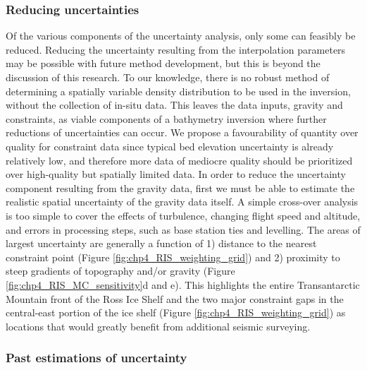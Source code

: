 \subsubsection{Reducing uncertainties}

Of the various components of the uncertainty analysis, only some can feasibly be reduced. Reducing the uncertainty resulting from the interpolation parameters may be possible with future method development, but this is beyond the discussion of this research. To our knowledge, there is no robust method of determining a spatially variable density distribution to be used in the inversion, without the collection of in-situ data. This leaves the data inputs, gravity and constraints, as viable components of a bathymetry inversion where further reductions of uncertainties can occur. We propose a favourability of quantity over quality for constraint data since typical bed elevation uncertainty is already relatively low, and therefore more data of mediocre quality should be prioritized over high-quality but spatially limited data. In order to reduce the uncertainty component resulting from the gravity data, first we must be able to estimate the realistic spatial uncertainty of the gravity data itself. A simple cross-over analysis is too simple to cover the effects of turbulence, changing flight speed and altitude, and errors in processing steps, such as base station ties and levelling. The areas of largest uncertainty are generally a function of 1) distance to the nearest constraint point (Figure \ref{fig:chp4_RIS_weighting_grid}) and 2) proximity to steep gradients of topography and/or gravity (Figure \ref{fig:chp4_RIS_MC_sensitivity}d and e). This highlights the entire Transantarctic Mountain front of the Ross Ice Shelf and the two major constraint gaps in the central-east portion of the ice shelf (Figure \ref{fig:chp4_RIS_weighting_grid}) as locations that would greatly benefit from additional seismic surveying. 

\subsubsection{Past estimations of uncertainty}

